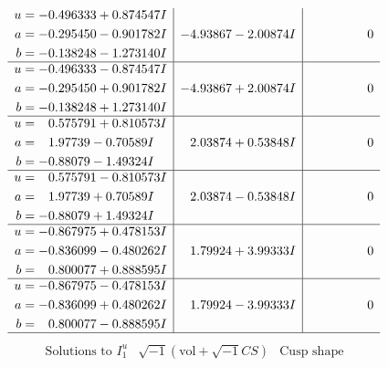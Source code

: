 \documentclass[1p]{elsarticle_modified}
\theoremstyle{definition}
\newcommand{\I}{\sqrt{-1}}
\begin{document}
$$\begin{array}{c|c|c}
\begin{aligned}
u &= -0.496333 + 0.874547 I \\
a &= -0.295450 - 0.901782 I \\
b &= -0.138248 - 1.273140 I\end{aligned}
 & -4.93867 - 2.00874 I & \phantom{-0.000000 } 0 \\ \hline\begin{aligned}
u &= -0.496333 - 0.874547 I \\
a &= -0.295450 + 0.901782 I \\
b &= -0.138248 + 1.273140 I\end{aligned}
 & -4.93867 + 2.00874 I & \phantom{-0.000000 } 0 \\ \hline\begin{aligned}
u &= \phantom{-}0.575791 + 0.810573 I \\
a &= \phantom{-}1.97739 - 0.70589 I \\
b &= -0.88079 - 1.49324 I\end{aligned}
 & \phantom{-}2.03874 + 0.53848 I & \phantom{-0.000000 } 0 \\ \hline\begin{aligned}
u &= \phantom{-}0.575791 - 0.810573 I \\
a &= \phantom{-}1.97739 + 0.70589 I \\
b &= -0.88079 + 1.49324 I\end{aligned}
 & \phantom{-}2.03874 - 0.53848 I & \phantom{-0.000000 } 0 \\ \hline\begin{aligned}
u &= -0.867975 + 0.478153 I \\
a &= -0.836099 - 0.480262 I \\
b &= \phantom{-}0.800077 + 0.888595 I\end{aligned}
 & \phantom{-}1.79924 + 3.99333 I & \phantom{-0.000000 } 0 \\ \hline\begin{aligned}
u &= -0.867975 - 0.478153 I \\
a &= -0.836099 + 0.480262 I \\
b &= \phantom{-}0.800077 - 0.888595 I\end{aligned}
 & \phantom{-}1.79924 - 3.99333 I & \phantom{-0.000000 } 0\\
 \hline 
 \end{array}$$\newpage$$\begin{array}{c|c|c}  
\text{Solutions to }I^u_{1}& \I (\text{vol} + \sqrt{-1}CS) & \text{Cusp shape}\\
 \hline 
\begin{aligned}

\end{aligned}
\end{array}$$
\end{document}
